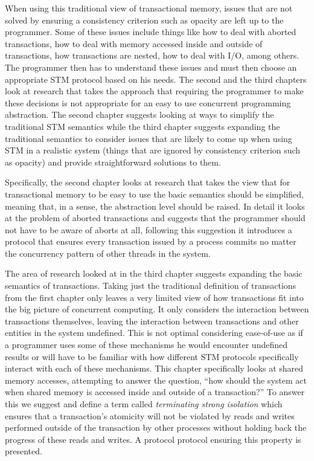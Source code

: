 When using this traditional view of transactional memory,
issues that are not solved by ensuring a consistency criterion such as opacity are left up to the programmer.
Some of these issues include things like how to deal with aborted transactions, how to deal
with memory accessed inside and outside of transactions, how transactions are nested,
how to deal with I/O, among others.
The programmer then has to understand these issues and must then choose an
appropriate STM protocol based on his needs.
The second and the third chapters look at research that takes the approach
that requiring the programmer to make these decisions
is not appropriate for an easy to use concurrent programming abstraction.
The second chapter suggests looking at ways to simplify the traditional STM
semantics while the third chapter suggests expanding the traditional semantics to consider
issues that are likely to come up when using STM in a realistic system
(things that are ignored by consistency criterion such as opacity)
and provide straightforward solutions to them.


Specifically, the second chapter looks at research that takes the view that for transactional memory to
be easy to use the basic semantics should be simplified, meaning that,
in a sense, the abstraction level should be raised.
In detail it looks at the problem of aborted transactions and suggests that
the programmer should not have to be aware of aborts at all, following this suggestion it introduces a protocol
that ensures every transaction issued by a process commits no matter the concurrency pattern
of other threads in the system.

The area of research looked at in the third chapter suggests expanding the basic semantics of transactions.
Taking just the traditional definition of transactions from the first chapter only leaves a very limited view of how
transactions fit into the big picture of concurrent computing.
It only considers the interaction between transactions themselves,
leaving the interaction between
transactions and other entities in the system undefined.
This is not optimal considering ease-of-use as if a programmer uses
some of these mechanisms he would encounter undefined results or will have
to be familiar with how different STM protocols specifically interact with 
each of these mechanisms.
This chapter specifically looks at shared memory accesses, attempting to answer the question, ``how should the system act when shared memory
is accessed inside and outside of a transaction?''
To answer this we suggest and define a term called \emph{terminating strong isolation} which ensures
that a transaction's atomicity will not be violated by reads and writes performed
outside of the transaction by other processes without holding back the progress of
these reads and writes.
A protocol protocol ensuring this property is presented.

